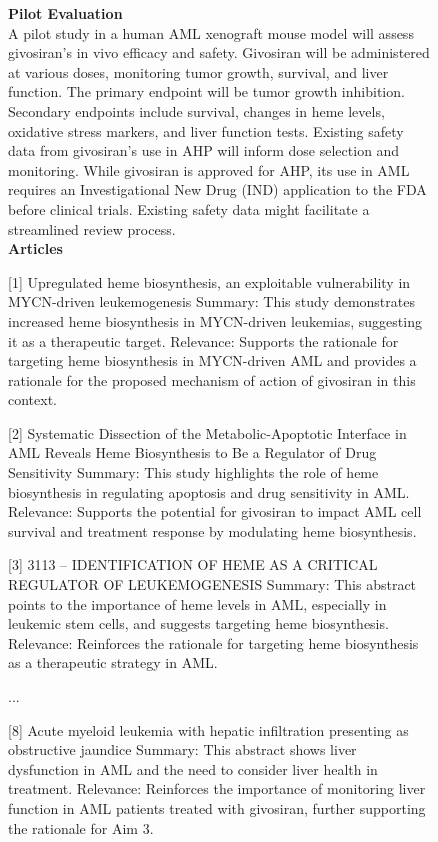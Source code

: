 \begin{figure}[htbp!]
\begin{tcolorbox}[title=Givosiran for AML (continued)]
\textbf{Pilot Evaluation}\\
A pilot study in a human AML xenograft mouse model will assess givosiran's in vivo efficacy and safety.  Givosiran will be administered at various doses, monitoring tumor growth, survival, and liver function. The primary endpoint will be tumor growth inhibition. Secondary endpoints include survival, changes in heme levels, oxidative stress markers, and liver function tests. Existing safety data from givosiran's use in AHP will inform dose selection and monitoring. While givosiran is approved for AHP, its use in AML requires an Investigational New Drug (IND) application to the FDA before clinical trials.  Existing safety data might facilitate a streamlined review process.\\

\textbf{Articles}

[1] Upregulated heme biosynthesis, an exploitable vulnerability in MYCN-driven leukemogenesis
Summary: This study demonstrates increased heme biosynthesis in MYCN-driven leukemias, suggesting it as a therapeutic target.
Relevance: Supports the rationale for targeting heme biosynthesis in MYCN-driven AML and provides a rationale for the proposed mechanism of action of givosiran in this context.

[2] Systematic Dissection of the Metabolic-Apoptotic Interface in AML Reveals Heme Biosynthesis to Be a Regulator of Drug Sensitivity
Summary: This study highlights the role of heme biosynthesis in regulating apoptosis and drug sensitivity in AML.
Relevance: Supports the potential for givosiran to impact AML cell survival and treatment response by modulating heme biosynthesis.

[3] 3113 – IDENTIFICATION OF HEME AS A CRITICAL REGULATOR OF LEUKEMOGENESIS
Summary: This abstract points to the importance of heme levels in AML, especially in leukemic stem cells, and suggests targeting heme biosynthesis.
Relevance: Reinforces the rationale for targeting heme biosynthesis as a therapeutic strategy in AML.

...

 [8] Acute myeloid leukemia with hepatic infiltration presenting as obstructive jaundice
Summary: This abstract shows liver dysfunction in AML and the need to consider liver health in treatment.
Relevance: Reinforces the importance of monitoring liver function in AML patients treated with givosiran, further supporting the rationale for Aim 3.
\end{tcolorbox}
\end{figure}


